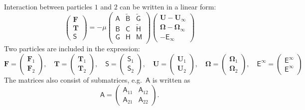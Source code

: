 \documentclass[11pt]{scrartcl}
\newcommand{\tens}[1]{\bm{\mathsf{#1}}}
\begin{document}
Interaction between particles $1$ and $2$
can be written in a linear form:
\begin{equation}
 \begin{pmatrix}
  \bm{F} \\ \bm{T} \\ \tens{S}
 \end{pmatrix}
 =
- \mu
\begin{pmatrix}
 \tens{A} &  \tilde{\tens{B}} &  \tilde{\tens{G}} \\
 \tens{B} &  \tens{C} &  \tilde{\tens{H}} \\
 \tens{G} &  \tens{H} &  \tens{M} \\
\end{pmatrix}
 \begin{pmatrix}
  \bm{U}-\bm{U}_{\infty} \\ \bm{\Omega} - \bm{\Omega}_{\infty}
 \\ -\tens{E}_{\infty}
 \end{pmatrix}
\end{equation}
Two particles are included in the expression:
\begin{equation}
 \bm{F}
= 
\begin{pmatrix}
 \bm{F}_1 \\  \bm{F}_2
\end{pmatrix}
,\quad
 \bm{T}
= 
\begin{pmatrix}
 \bm{T}_1 \\  \bm{T}_2
\end{pmatrix}
,\quad
 \tens{S}
= 
\begin{pmatrix}
 \tens{S}_1 \\  \tens{S}_2
\end{pmatrix}
,\quad
 \bm{U}
= 
\begin{pmatrix}
 \bm{U}_1 \\  \bm{U}_2
\end{pmatrix}
,\quad
 \bm{\Omega}
= 
\begin{pmatrix}
 \bm{\Omega}_1 \\  \bm{\Omega}_2
\end{pmatrix}
,\quad
 \tens{E}^{\infty}
= 
\begin{pmatrix}
  \tens{E}^{\infty} \\   \tens{E}^{\infty}
\end{pmatrix}
\end{equation}
The matrices also consist of submatrices,
e.g.~$\tens{A}$ is written as
\begin{equation}
 \tens{A}
 =
\begin{pmatrix}
  \tens{A}_{11} & \tens{A}_{12} \\
  \tens{A}_{21} & \tens{A}_{22} 
\end{pmatrix}.
\end{equation}
%
\end{document}
